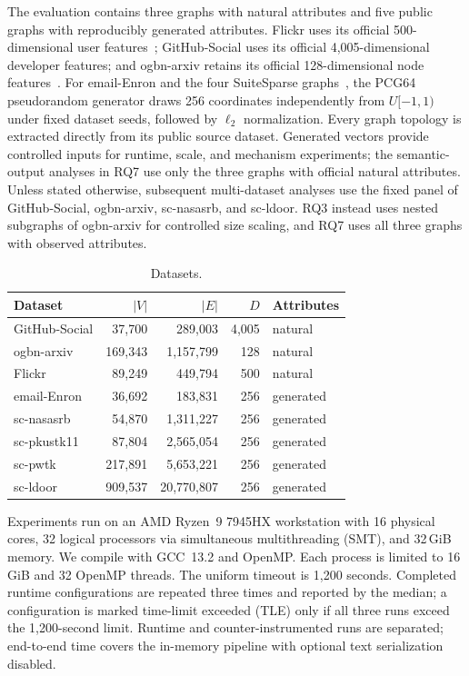 \documentclass[sigconf, nonacm]{acmart}
\newcommand{\stitle}[1]{\vspace{0.7ex} \noindent{\bf #1}}
\begin{document}
\stitle{Datasets.}
The evaluation contains three graphs with natural attributes and five public
graphs with reproducibly generated attributes. Flickr uses its official
500-dimensional user features~\cite{zeng2020graphsaint}; GitHub-Social uses its
official 4,005-dimensional developer features; and ogbn-arxiv retains its
official 128-dimensional node features~\cite{rozemberczki2021musae,wang2020ogb}. For email-Enron and the four
SuiteSparse graphs~\cite{leskovec2014snap,davis2011uf}, the PCG64 pseudorandom
generator draws 256 coordinates independently from $U[-1,1)$ under fixed
dataset seeds, followed by $\ell_2$ normalization. Every graph topology is
extracted directly from its public source dataset. Generated vectors provide
controlled inputs for runtime, scale, and mechanism experiments; the
semantic-output analyses in RQ7 use only the three graphs with official natural
attributes.
Unless stated otherwise, subsequent multi-dataset analyses use the fixed panel
of GitHub-Social, ogbn-arxiv, sc-nasasrb, and sc-ldoor. RQ3 instead uses nested
subgraphs of ogbn-arxiv for controlled size scaling, and RQ7 uses all three
graphs with observed attributes.

\begin{table}[t]
\footnotesize
\centering
\caption{Datasets.}
\label{tab:datasets}
\vspace{-3mm}
\setlength{\tabcolsep}{3.6pt}
\begin{tabular*}{\linewidth}{@{\extracolsep{\fill}}lrrrl@{}}
\toprule
Dataset & $|V|$ & $|E|$ & $D$ & Attributes \\
\midrule
GitHub-Social & 37,700 & 289,003 & 4,005 & natural \\
ogbn-arxiv & 169,343 & 1,157,799 & 128 & natural \\
Flickr & 89,249 & 449,794 & 500 & natural \\
email-Enron & 36,692 & 183,831 & 256 & generated \\
sc-nasasrb & 54,870 & 1,311,227 & 256 & generated \\
sc-pkustk11 & 87,804 & 2,565,054 & 256 & generated \\
sc-pwtk & 217,891 & 5,653,221 & 256 & generated \\
sc-ldoor & 909,537 & 20,770,807 & 256 & generated \\
\bottomrule
\end{tabular*}
\end{table}

\stitle{Protocol.}
Experiments run on an AMD Ryzen~9 7945HX workstation with 16 physical cores,
32 logical processors via simultaneous multithreading (SMT), and 32\,GiB
memory. We compile with GCC~13.2 and OpenMP.
Each process is limited to 16\,GiB and 32 OpenMP threads. The uniform timeout is
1,200 seconds. Completed runtime configurations are repeated three times and
reported by the median; a configuration is marked time-limit exceeded (TLE)
only if all three runs exceed the 1,200-second limit.
Runtime and counter-instrumented runs are separated; end-to-end time covers the
in-memory pipeline with optional text serialization disabled.
\end{document}

